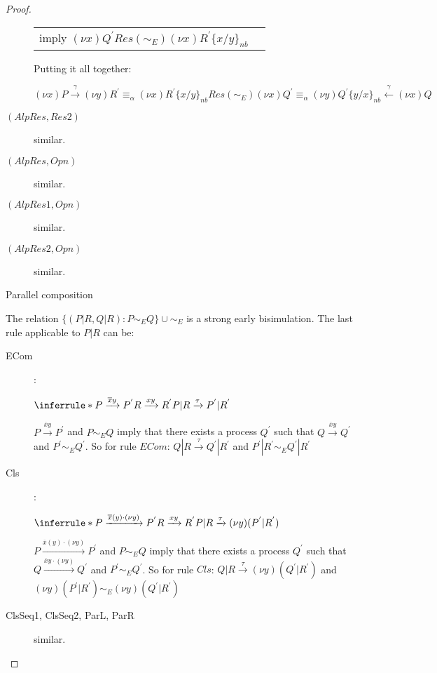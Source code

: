 \begin{lemma}
\begin{proof}
\begin{description}
\begin{center}
\begin{tabular}{ll}
		  imply $(\nu x)Q^{'} Res(\sim_{E}) (\nu x)R^{'}\{x/y\}_{nb}$
		&
	      \\
	      \end{tabular}
	    \end{center}
	    Putting it all together:
 	    \begin{center}
 	      $(\nu x)P \xrightarrow{\gamma} (\nu y)R^{'} \equiv_{\alpha} (\nu x)R^{'}\{x/y\}_{nb} Res(\sim_{E}) (\nu x)Q^{'} \equiv_{\alpha} (\nu y)Q^{'}\{y/x\}_{nb} \stackrel{\gamma}{\leftarrow} (\nu x)Q$
 	    \end{center}
 	  \item[$(AlpRes, Res2)$] similar.
  	  \item[$(AlpRes, Opn)$] similar.
  	  \item[$(AlpRes1, Opn)$] similar.
  	  \item[$(AlpRes2, Opn)$] similar.
	\end{description}
    \begin{description}
      \item[Parallel composition]
    \end{description}
	The relation $\{(P|R, Q|R): P\sim_{E} Q\} \cup \sim_{E}$ is a strong early bisimulation. The last rule applicable to $P|R$ can be:
	\begin{description}
	  \item[ECom]:
	    \begin{center}
	      $\inferrule* {
		  P \xrightarrow{\overline{x}y} P^{'}
		\\
		  R \xrightarrow{xy} R^{'}
	      }{
		P|R \xrightarrow{\tau} P^{'}|R^{'}
	      }$
	    \end{center}
	    $P \xrightarrow{\overline{x}y} P^{'}$ and $P\sim_{E} Q$ imply that there exists a process $Q^{'}$ such that $Q \xrightarrow{\overline{x}y} Q^{'}$ and $P^{'}\sim_{E} Q^{'}$. So for rule $ECom$: $Q|R \xrightarrow{\tau} Q^{'}|R^{'}$ and $P^{'}|R^{'}\sim_{E} Q^{'}|R^{'}$
	  \item[Cls]:
	    \begin{center}
	      $\inferrule* {
		  P \xrightarrow{\overline{x}(y) \cdot (\nu y)} P^{'}
		\\
		  R \xrightarrow{xy} R^{'}
	      }{
		P|R \xrightarrow{\tau} (\nu y)(P^{'}|R^{'})
	      }$
	    \end{center}
	    $P \xrightarrow{\overline{x}(y) \cdot (\nu y)} P^{'}$ and $P\sim_{E} Q$ imply that there exists a process $Q^{'}$ such that $Q \xrightarrow{\overline{x}y \cdot (\nu y)} Q^{'}$ and $P^{'}\sim_{E} Q^{'}$. So for rule $Cls$: $Q|R \xrightarrow{\tau} (\nu y)(Q^{'}|R^{'})$ and $(\nu y)(P^{'}|R^{'}) \sim_{E} (\nu y)(Q^{'}|R^{'})$
	  \item[ClsSeq1, ClsSeq2, ParL, ParR] similar.
    \end{description}
  \end{proof}
\end{lemma}


